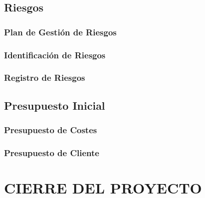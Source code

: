 \subsection{Riesgos}

\subsubsection{Plan de Gestión de Riesgos} 

\subsubsection{Identificación de Riesgos}

\subsubsection{Registro de Riesgos} 



\subsection{Presupuesto Inicial}

\subsubsection{Presupuesto de Costes}

\subsubsection{Presupuesto de Cliente} 


%
%
%


\newpage
\section{CIERRE DEL PROYECTO}


